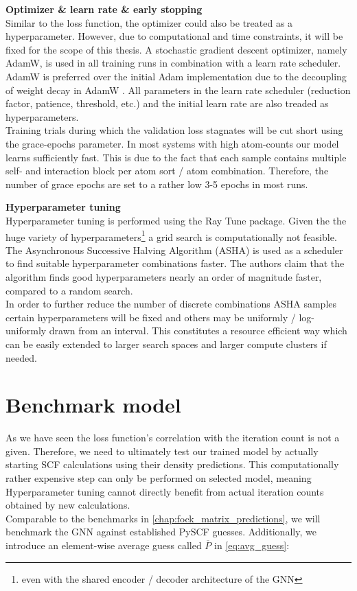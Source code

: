 \textbf{Optimizer \& learn rate \& early stopping}\\
Similar to the loss function, the optimizer could also be treated as a hyperparameter. However, due to computational and time constraints, it will be fixed for the scope of this thesis. A stochastic gradient descent optimizer, namely AdamW, is used in all training runs in combination with a learn rate scheduler. AdamW is preferred over the initial Adam implementation due to the decoupling of weight decay in AdamW \parencite{ref:adamW}. All parameters in the learn rate scheduler (reduction factor, patience, threshold, etc.) and the initial learn rate are also treaded as hyperparameters. \\
Training trials during which the validation loss stagnates will be cut short using the grace-epochs parameter. In most systems with high atom-counts our model learns sufficiently fast. This is due to the fact that each sample contains multiple self- and interaction block per atom sort / atom combination. Therefore, the number of grace epochs are set to a rather low 3-5 epochs in most runs. 

\textbf{Hyperparameter tuning}\\
Hyperparameter tuning is performed using the Ray Tune \parencite{ref:ray_tune} package. Given the the huge variety of hyperparameters\footnote{even with the shared encoder / decoder architecture of the GNN} a grid search is computationally not feasible. The Asynchronous Successive Halving Algorithm (ASHA) is used as a scheduler to find suitable hyperparameter combinations faster. The authors claim that the algorithm finds good hyperparameters nearly an order of magnitude faster, compared to a random search.\parencite{ref:ASHA}\\
In order to further reduce the number of discrete combinations ASHA samples certain hyperparameters will be fixed and others may be uniformly / log-uniformly drawn from an interval. This constitutes a resource efficient way which can be easily extended to larger search spaces and larger compute clusters if needed. 

\section{Benchmark model}
\label{sec:0_d_benchmark_model}
As we have seen the loss function's correlation with the iteration count is not a given. Therefore, we need to ultimately test our trained model by actually starting SCF calculations using their density predictions. This computationally rather expensive step can only be performed on selected model, meaning Hyperparameter tuning cannot directly benefit from actual iteration counts obtained by new calculations.\\
Comparable to the benchmarks in \autoref{chap:fock_matrix_predictions}, we will benchmark the GNN against established PySCF guesses. Additionally, we introduce an element-wise average guess called $\overline{P}$ in \autoref{eq:avg_guess}: 

